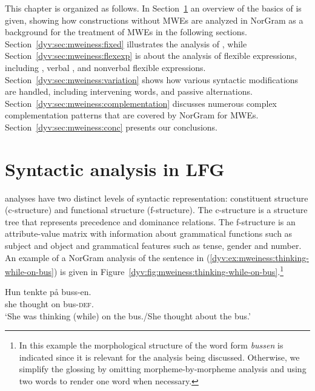 \documentclass[output=paper]{langsci/langscibook}
\newcommand{\definite}{\textsc{def}{}\xspace}	%
\begin{document}
This chapter is organized as follows.
In Section~\ref{dyv:sec:mweiness:LFG} an overview of the basics of  is given, showing how constructions without MWEs are analyzed in NorGram as a background for the treatment of MWEs in the following sections.
Section~\ref{dyv:sec:mweiness:fixed} illustrates the analysis of , while Section~\ref{dyv:sec:mweiness:flexexp} is about the analysis of flexible expressions, including , verbal , and nonverbal flexible expressions.
Section~\ref{dyv:sec:mweiness:variation} shows how various syntactic modifications are handled, including intervening words,  and passive alternations.
Section~\ref{dyv:sec:mweiness:complementation} discusses numerous complex complementation patterns that are covered by NorGram for  MWEs.
Section~\ref{dyv:sec:mweiness:conc} presents our conclusions.

\section{Syntactic analysis in LFG}\label{dyv:sec:mweiness:LFG}

 analyses have two distinct levels of syntactic representation: constituent structure (c-structure) and functional structure (f-structure).
The c-structure is a  structure tree that represents precedence and dominance relations.
The f-structure is an attribute-value matrix with information about grammatical functions such as subject and object and grammatical features such as tense, gender and number.
An example of a NorGram analysis of the sentence in (\ref{dyv:ex:mweiness:thinking-while-on-bus}) is given in Figure~\ref{dyv:fig:mweiness:thinking-while-on-bus}.\footnote{In this example the morphological structure of the word form \textit{bussen} is indicated since it is relevant for the analysis being discussed.
Otherwise, we simplify the glossing by omitting morpheme-by-morpheme analysis and using two  words to render one  word when necessary.}

\ea\label{dyv:ex:mweiness:thinking-while-on-bus}
\gll Hun tenkte på buss-en. \\
     she thought on bus-{\definite}.{\sg}\\
\glt `She was thinking (while) on the bus./She thought about the bus.’
\z
\end{document}
